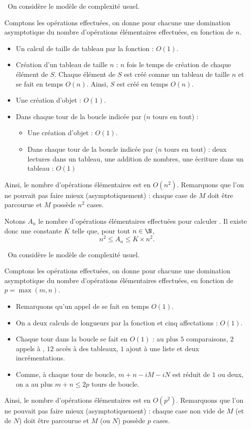 \question\ 
On considère le modèle de complexité usuel. 

Comptons les opérations effectuées, on donne pour chacune une domination asymptotique du nombre d'opérations élémentaires effectuées, en fonction de $n$. 
\begin{itemize}
  \item Un calcul de taille de tableau par la fonction  : $O(1)$. 
  \item Création d'un tableau de taille $n$ : $n$ fois le temps de création de chaque élément de $S$. Chaque élément de $S$ est créé comme un tableau de taille $n$ et se fait en temps $O(n)$. 
    Ainsi, $S$ est créé en temps $O(n)$. 
  \item Une création d'objet  : $O(1)$. 
  \item Dans chaque tour de la boucle indicée par  ($n$ tours en tout) : 
    \begin{itemize}
      \item Une création d'objet  : $O(1)$. 
      \item Dans chaque tour de la boucle indicée par  ($n$ tours en tout) : deux lectures dans un tableau, une addition de nombres, une écriture dans un tableau : $O(1)$
    \end{itemize}
\end{itemize}
Ainsi, le nombre d'opérations élémentaires est en $O(n^2)$. Remarquons que l'on ne pouvait pas faire mieux (asymptotiquement) : chaque case de $M$ doit être parcourue et $M$ possède $n^2$ cases. 

Notons $A_n$ le nombre d'opérations élémentaires effectuées pour calculer . Il existe donc une constante $K$ telle que, pour tout $n\in\N$, 
\begin{equation*}
  n^2 \leq A_n \leq K\times n^2.
\end{equation*}

\question\ 
On considère le modèle de complexité usuel. 

Comptons les opérations effectuées, on donne pour chacune une domination asymptotique du nombre d'opérations élémentaires effectuées, en fonction de $p = \max(m,n)$.
\begin{itemize}
  \item Remarquons qu'un appel de \pyv{lexico} se fait en temps $O(1)$. 
  \item On a deux calculs de longueurs par la fonction  et cinq affectations : $O(1)$.
  \item Chaque tour dans la boucle \pyv{while} se fait en $O(1)$ : au plus $5$ comparaisons, $2$ appels à , $12$ accès à des tableaux, $1$ ajout à une liste et deux incrémentations. 
  \item Comme, à chaque tour de boucle, $m+n-iM-iN$ est réduit de $1$ ou deux, on a au plus $m+n\leq 2p$ tours de boucle. 
\end{itemize}
Ainsi, le nombre d'opérations élémentaires est en $O(p^2)$. Remarquons que l'on ne pouvait pas faire mieux (asymptotiquement) : chaque case non vide de $M$ (et de $N$) doit être parcourue et $M$ (ou $N$) possède $p$ cases. 

